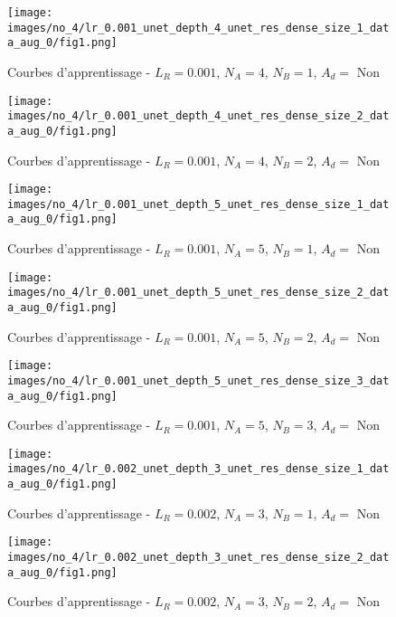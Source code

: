     \begin{figure}[H]
        \centering 
        \texttt{[image: images/no\_4/lr\_0.001\_unet\_depth\_4\_unet\_res\_dense\_size\_1\_data\_aug\_0/fig1.png]}
        \caption{Courbes d’apprentissage - \(L_R=0.001\), \(N_A=4\), \(N_B=1\), \(A_d= \) Non}
    \end{figure}
    
    \begin{figure}[H]
        \centering 
        \texttt{[image: images/no\_4/lr\_0.001\_unet\_depth\_4\_unet\_res\_dense\_size\_2\_data\_aug\_0/fig1.png]}
        \caption{Courbes d’apprentissage - \(L_R=0.001\), \(N_A=4\), \(N_B=2\), \(A_d= \) Non}
    \end{figure}

    \begin{figure}[H]
        \centering 
        \texttt{[image: images/no\_4/lr\_0.001\_unet\_depth\_5\_unet\_res\_dense\_size\_1\_data\_aug\_0/fig1.png]}
        \caption{Courbes d’apprentissage - \(L_R=0.001\), \(N_A=5\), \(N_B=1\), \(A_d= \) Non}
    \end{figure}
    
    \begin{figure}[H]
        \centering 
        \texttt{[image: images/no\_4/lr\_0.001\_unet\_depth\_5\_unet\_res\_dense\_size\_2\_data\_aug\_0/fig1.png]}
        \caption{Courbes d’apprentissage - \(L_R=0.001\), \(N_A=5\), \(N_B=2\), \(A_d= \) Non}
    \end{figure}
    
    \begin{figure}[H]
        \centering 
        \texttt{[image: images/no\_4/lr\_0.001\_unet\_depth\_5\_unet\_res\_dense\_size\_3\_data\_aug\_0/fig1.png]}
        \caption{Courbes d’apprentissage - \(L_R=0.001\), \(N_A=5\), \(N_B=3\), \(A_d= \) Non}
    \end{figure}

    \begin{figure}[H]
        \centering 
        \texttt{[image: images/no\_4/lr\_0.002\_unet\_depth\_3\_unet\_res\_dense\_size\_1\_data\_aug\_0/fig1.png]}
        \caption{Courbes d’apprentissage - \(L_R=0.002\), \(N_A=3\), \(N_B=1\), \(A_d= \) Non}
    \end{figure}
    
    \begin{figure}[H]
        \centering 
        \texttt{[image: images/no\_4/lr\_0.002\_unet\_depth\_3\_unet\_res\_dense\_size\_2\_data\_aug\_0/fig1.png]}
        \caption{Courbes d’apprentissage - \(L_R=0.002\), \(N_A=3\), \(N_B=2\), \(A_d= \) Non}
    \end{figure}
    
